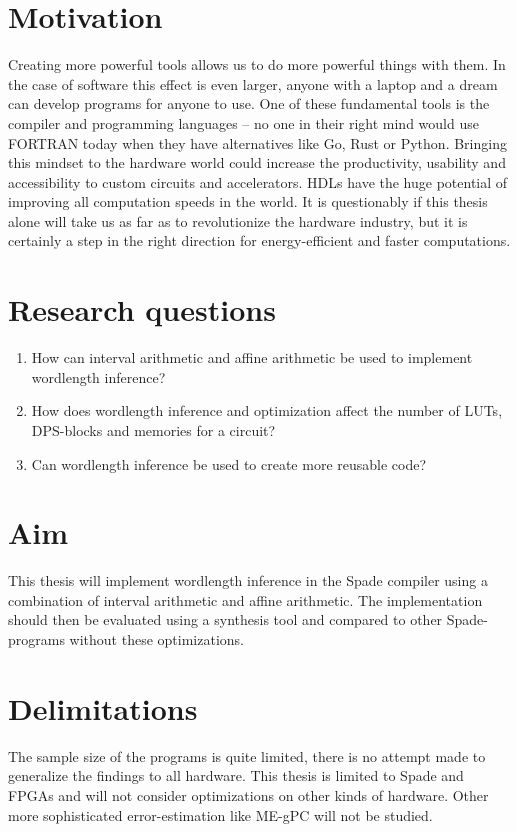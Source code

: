 \documentclass[msc,lith,english]{liuthesis}
\providecommand{\DIFadd}[1]{{\protect\color{blue}\uwave{#1}}} %
\providecommand{\DIFaddbegin}{} %
\providecommand{\DIFaddend}{} %
\begin{document}
\section{Motivation}
Creating more powerful tools allows us to do more powerful things with them. In the case of software this effect is even larger, anyone with a laptop and a dream can develop programs for anyone to use. One of these fundamental tools is the compiler and programming languages -- no one in their right mind would use FORTRAN today when they have alternatives like Go, Rust or Python. Bringing this mindset to the hardware world could increase the productivity, usability and accessibility to custom circuits and accelerators. HDLs have the huge potential of improving all computation speeds in the world. It is questionably if this thesis alone will take us as far as to revolutionize the hardware industry, but it is certainly a step in the right direction for energy-efficient and faster computations.

\section{Research questions}
\begin{enumerate}
  \item How can interval arithmetic and affine arithmetic be used to implement wordlength inference?
  \item How does wordlength inference and optimization affect the number of LUTs, DPS-blocks and memories for a circuit?
  \item Can wordlength inference be used to create more reusable code?
\end{enumerate}

\section{Aim}
This thesis will implement wordlength inference in the Spade compiler using a combination of interval arithmetic and affine arithmetic. The implementation should then be evaluated using a synthesis tool and compared to other Spade-programs without these optimizations.

\section{Delimitations}
The sample size of the programs is quite limited, there is no attempt made to generalize the findings to all hardware. This thesis is limited to Spade and FPGAs and will not consider optimizations on other kinds of hardware. Other more sophisticated error-estimation like ME-gPC \DIFaddbegin \DIFadd{and modified addine arithmetic }\DIFaddend will not be studied.
\end{document}
